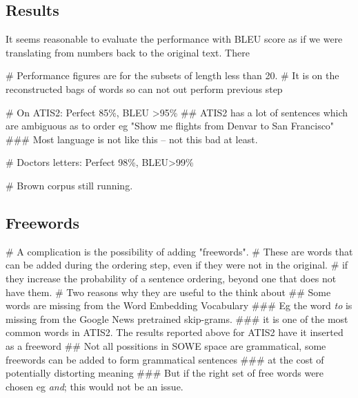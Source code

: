\documentclass[]{scrartcl}
\begin{document}
\subsection{Results}
It seems reasonable to evaluate the performance with BLEU score as if we were translating from numbers back to the original text. 
There 
\begin{easylist}[itemize]
	# Performance figures are for the subsets of length less than 20. 
	# It is on the reconstructed bags of words so can not out perform previous step
	
	# On ATIS2: Perfect 85\%,  BLEU >95\%
	## ATIS2 has a lot of sentences which are ambiguous as to order eg "Show me flights from Denvar to San Francisco"
	### Most language is not like this -- not this bad at least.
	
	# Doctors letters: Perfect 98\%, BLEU>99\%
	
	# Brown corpus still running.
\end{easylist}
 

\subsection{Freewords}
\begin{easylist}[itemize]
# A complication is the possibility of adding "freewords".
# These are words that can be added during the ordering step, even if they were not in the original.
# if they increase the probability of a sentence ordering, beyond one that does not have them.
# Two reasons why they are useful to the think about
## Some words are missing from the Word Embedding Vocabulary
### Eg the word \emph{to} is missing from the Google News pretrained skip-grams. 
### it is one of the most common words in ATIS2. The results reported above for ATIS2 have it inserted as a freeword
## Not all possitions in SOWE space are grammatical, some freewords can be added to form grammatical sentences 
### at the cost of potentially distorting meaning
### But if the right set of free words were chosen eg \emph{and}; this would not be an issue.
\end{easylist}


 
\newcommand{\mdiagram}[4][0.9]{%
\begin{landscape}
	
\end{landscape}
}
\end{document}
